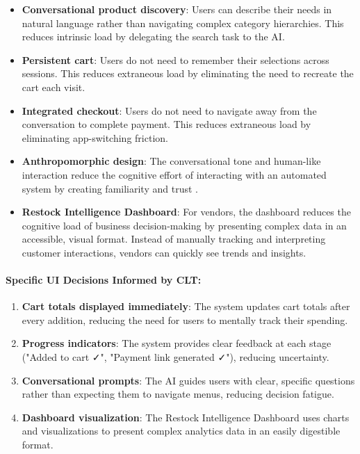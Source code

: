 \documentclass[12pt,a4paper]{article}
\begin{document}
\begin{itemize}
    \item \textbf{Conversational product discovery}: Users can describe their needs in natural language rather than navigating complex category hierarchies. This reduces intrinsic load by delegating the search task to the AI.
    \item \textbf{Persistent cart}: Users do not need to remember their selections across sessions. This reduces extraneous load by eliminating the need to recreate the cart each visit.
    \item \textbf{Integrated checkout}: Users do not need to navigate away from the conversation to complete payment. This reduces extraneous load by eliminating app-switching friction.
    \item \textbf{Anthropomorphic design}: The conversational tone and human-like interaction reduce the cognitive effort of interacting with an automated system by creating familiarity and trust \citep{adam2021}.
    \item \textbf{Restock Intelligence Dashboard}: For vendors, the dashboard reduces the cognitive load of business decision-making by presenting complex data in an accessible, visual format. Instead of manually tracking and interpreting customer interactions, vendors can quickly see trends and insights.
\end{itemize}

\paragraph{Specific UI Decisions Informed by CLT:}

\begin{enumerate}
    \item \textbf{Cart totals displayed immediately}: The system updates cart totals after every addition, reducing the need for users to mentally track their spending.
    \item \textbf{Progress indicators}: The system provides clear feedback at each stage ("Added to cart ✓", "Payment link generated ✓"), reducing uncertainty.
    \item \textbf{Conversational prompts}: The AI guides users with clear, specific questions rather than expecting them to navigate menus, reducing decision fatigue.
    \item \textbf{Dashboard visualization}: The Restock Intelligence Dashboard uses charts and visualizations to present complex analytics data in an easily digestible format.
\end{enumerate}
\end{document}
